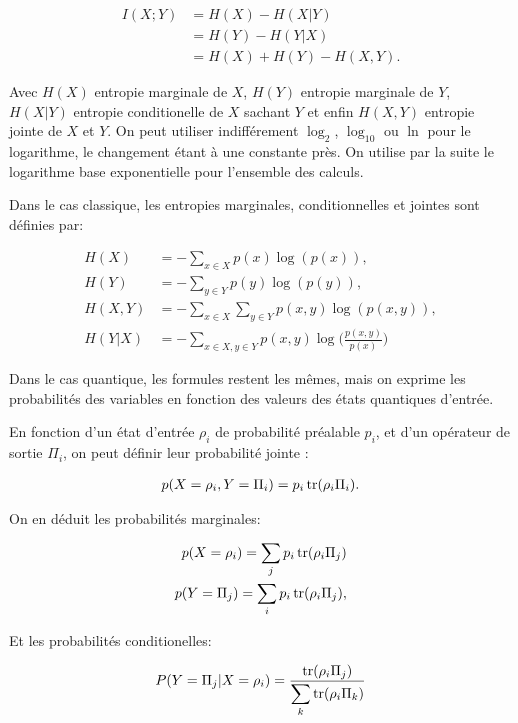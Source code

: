 \begin{align}
    I(X; Y) &= H(X) - H(X | Y) \\
            &= H(Y) - H(Y | X) \\
            &= H(X) + H(Y) - H(X, Y).
\end{align}

Avec $H(X)$ entropie marginale de $X$, $H(Y)$ entropie marginale de $Y$, $H(X|Y)$ entropie conditionelle de $X$ sachant $Y$ et enfin $H(X, Y)$ entropie jointe de $X$ et $Y$. On peut utiliser indifférement $\log_2$, $\log_{10}$ ou $\ln$ pour le logarithme, le changement étant à une constante près. On utilise par la suite le logarithme base exponentielle pour l'ensemble des calculs.

Dans le cas classique, les entropies marginales, conditionnelles et jointes sont définies par: 

\begin{align}
    H(X) &= -\displaystyle \sum_{x \in X} p(x) \log(p(x)) , \\
    H(Y) &= -\displaystyle \sum_{y \in Y} p(y) \log(p(y)) , \\
    H(X, Y) &= -\displaystyle \sum_{x \in X} \displaystyle \sum_{y \in Y} p(x, y) \log(p(x, y)), \\
    H(Y|X) &= -\displaystyle \sum_{x \in X, y \in Y} p(x, y) \log \big(\frac{p(x, y)}{p(x)}\big)
\end{align}

Dans le cas quantique, les formules restent les mêmes, mais on exprime les probabilités des variables en fonction des valeurs des états quantiques d'entrée.

En fonction d'un état d'entrée $\rho_i$ de probabilité préalable $p_i$, et d'un opérateur de sortie $\Pi_i$, on peut définir leur probabilité jointe :

\begin{align}
    p(X = \rho_i, Y = \Pi_i) = p_i \operatorname{tr}(\rho_i \Pi_i).
\end{align}

On en déduit les probabilités marginales:

\begin{align}
    p(X = \rho_i) = \displaystyle \sum_{j}p_i \operatorname{tr}(\rho_i \Pi_j)  \\
    p(Y = \Pi_j) = \displaystyle \sum_{i}p_i \operatorname{tr}(\rho_i \Pi_j),
\end{align}

Et les probabilités conditionelles:

\begin{align}
    P(Y=\Pi_j | X=\rho_i) = \frac{\operatorname{tr}(\rho_i \Pi_j)}{\displaystyle \sum_{k} \operatorname{tr}(\rho_i \Pi_k)}
\end{align}

